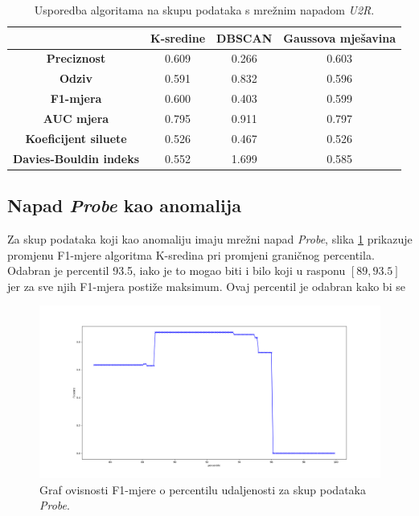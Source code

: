 \documentclass[utf8, diplomski, numeric]{fer}
\begin{document}
\begin{table}[h!]
  \begin{center}
    \caption{Usporedba algoritama na skupu podataka s mrežnim napadom \textit{U2R}.}
    \label{tab:u2r}
    \begin{tabular}{c|c|c|c} 
      & \textbf{K-sredine} & \textbf{DBSCAN}  & \textbf{Gaussova mješavina}\\
      \hline
      \textbf{Preciznost} & 0.609 & 0.266 & 0.603 \\
      \textbf{Odziv} & 0.591 & 0.832 & 0.596 \\
      \textbf{F1-mjera} & 0.600 & 0.403 & 0.599 \\
      \textbf{AUC mjera} & 0.795 & 0.911 & 0.797 \\
       \textbf{Koeficijent siluete} & 0.526 & 0.467 & 0.526 \\
       \textbf{Davies-Bouldin indeks} & 0.552 & 1.699 & 0.585 \\
     \end{tabular}
  \end{center}
\end{table}

\subsection{Napad \textit{Probe} kao anomalija}
Za skup podataka koji kao anomaliju imaju mrežni napad \textit{Probe}, slika \ref{fig:probe-kmeans} prikazuje promjenu F1-mjere algoritma K-sredina pri promjeni graničnog percentila. Odabran je percentil 93.5, iako je to mogao biti i bilo koji u rasponu $[89, 93.5]$ jer za sve njih F1-mjera postiže maksimum. Ovaj percentil je odabran kako bi se 

\begin{figure}[h!]
\includegraphics[width=1\textwidth]{images/probe-kmeans-f1.png}
\centering
\caption{Graf ovisnosti F1-mjere o percentilu udaljenosti za skup podataka \textit{Probe}.}
\label{fig:probe-kmeans}
\end{figure}
\end{document}
